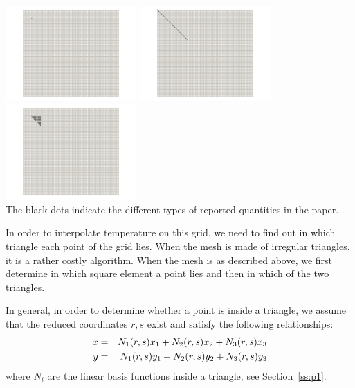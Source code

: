 \begin{center}
\includegraphics[width=5cm]{python_codes/fieldstone_68/images/grid3}
\includegraphics[width=5cm]{python_codes/fieldstone_68/images/grid4}
\includegraphics[width=5cm]{python_codes/fieldstone_68/images/grid5}\\
{\captionfont The black dots indicate the different types of reported quantities in the paper.}
\end{center}


In order to interpolate temperature on this grid, we need to find out in which 
triangle each point of the grid lies. When the mesh is made of irregular triangles, 
it is a rather costly algorithm. When the mesh is as described above, we first 
determine in which square element  a point lies and then in which of the 
two triangles. 

In general, in order to determine whether a point is inside a triangle, we assume that 
the reduced coordinates $r,s$ exist and satisfy the following 
relationships:
\begin{eqnarray}
x &=& N_1(r,s) x_1 + N_2(r,s) x_2 + N_3(r,s) x_3 \nonumber\\  
y &=& N_1(r,s) y_1 + N_2(r,s) y_2 + N_3(r,s) y_3 \nonumber
\end{eqnarray}
where $N_i$ are the linear basis functions inside a triangle, see Section~\ref{ss:p1}.


